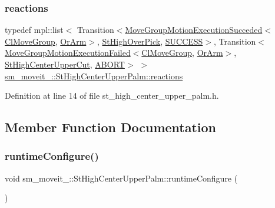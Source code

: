 \subsubsection{\texorpdfstring{reactions}{reactions}}
{\footnotesize\ttfamily typedef mpl\+::list$<$ Transition$<$\hyperlink{structmoveit__z__client_1_1MoveGroupMotionExecutionSucceded}{Move\+Group\+Motion\+Execution\+Succeded}$<$\hyperlink{classmoveit__z__client_1_1ClMoveGroup}{Cl\+Move\+Group}, \hyperlink{classsm__moveit__3_1_1OrArm}{Or\+Arm}$>$, \hyperlink{structsm__moveit__3_1_1StHighOverPick}{St\+High\+Over\+Pick}, \hyperlink{classSUCCESS}{S\+U\+C\+C\+E\+SS}$>$, Transition$<$\hyperlink{structmoveit__z__client_1_1MoveGroupMotionExecutionFailed}{Move\+Group\+Motion\+Execution\+Failed}$<$\hyperlink{classmoveit__z__client_1_1ClMoveGroup}{Cl\+Move\+Group}, \hyperlink{classsm__moveit__3_1_1OrArm}{Or\+Arm}$>$, \hyperlink{structsm__moveit__3_1_1StHighCenterUpperCut}{St\+High\+Center\+Upper\+Cut}, \hyperlink{classABORT}{A\+B\+O\+RT}$>$ $>$ \hyperlink{structsm__moveit__3_1_1StHighCenterUpperPalm_aad95efec300751f5b6021f941c660dbe}{sm\+\_\+moveit\+\_\+::\+St\+High\+Center\+Upper\+Palm\+::reactions}}



Definition at line 14 of file st\+\_\+high\+\_\+center\+\_\+upper\+\_\+palm.\+h.



\subsection{Member Function Documentation}
\mbox{\label{structsm__moveit__3_1_1StHighCenterUpperPalm_abe603caed1d44c662d4bf6e18159d828}} 
\subsubsection{\texorpdfstring{runtime\+Configure()}{runtimeConfigure()}}
{\footnotesize\ttfamily void sm\+\_\+moveit\+\_\+::\+St\+High\+Center\+Upper\+Palm\+::runtime\+Configure (\begin{DoxyParamCaption}{ }\end{DoxyParamCaption})\hspace{0.3cm}{\ttfamily [inline]}}



